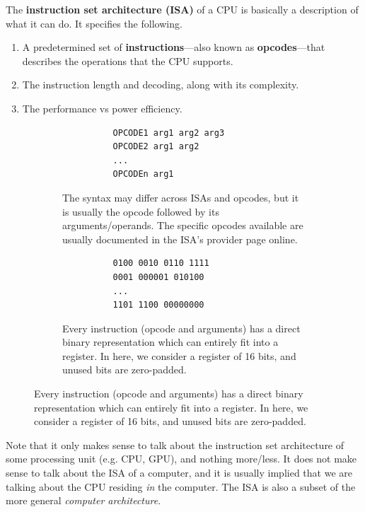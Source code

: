   \begin{definition}
    The \textbf{instruction set architecture (ISA)} of a CPU is basically a description of what it can do. It specifies the following. 
    \begin{enumerate}
      \item A predetermined set of \textbf{instructions}---also known as \textbf{opcodes}---that describes the operations that the CPU supports. 
      \item The instruction length and decoding, along with its complexity. 
      \item The performance vs power efficiency. 
    \end{enumerate}

    \begin{figure}[H]
      \centering
      \begin{subfigure}[b]{0.48\textwidth}
        \centering
        \begin{lstlisting}
          OPCODE1 arg1 arg2 arg3 
          OPCODE2 arg1 arg2
          ...
          OPCODEn arg1 
        \end{lstlisting}
        \caption{The syntax may differ across ISAs and opcodes, but it is usually the opcode followed by its arguments/operands. The specific opcodes available are usually documented in the ISA's provider page online.}
      \end{subfigure}
      \hfill 
      \begin{subfigure}[b]{0.48\textwidth}
        \centering
        \begin{lstlisting}
          0100 0010 0110 1111 
          0001 000001 010100
          ... 
          1101 1100 00000000 
        \end{lstlisting}
        \caption{Every instruction (opcode and arguments) has a direct binary representation which can entirely fit into a register. In here, we consider a register of 16 bits, and unused bits are zero-padded.}
      \end{subfigure}
      \label{fig:isa_syntax}
    \end{figure}
  \end{definition}

  Note that it only makes sense to talk about the instruction set architecture of some processing unit (e.g. CPU, GPU), and nothing more/less. It does not make sense to talk about the ISA of a computer, and it is usually implied that we are talking about the CPU residing \textit{in} the computer. The ISA is also a subset of the more general \textit{computer architecture}. 

